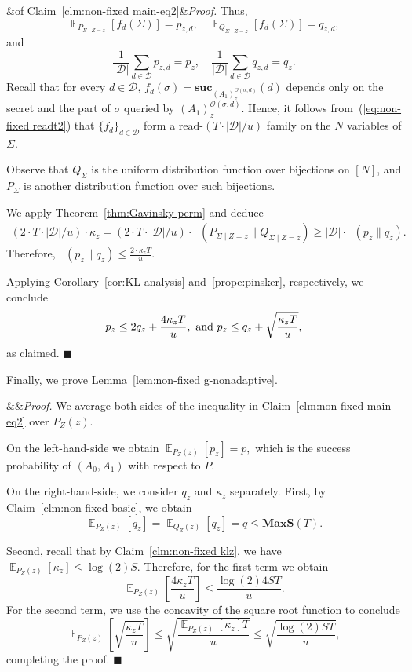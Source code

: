 \documentclass[11pt]{article}
\renewenvironment{proof}[1][]
    {\noindent
       \ifx&#1&{\it Proof.}
       \else{\it Proof ({#1}).}
       \fi}{\hfill $\blacksquare$}
\DeclareMathOperator*{\E}{\mathbb{E}}
\DeclareMathOperator{\KL}{D_{\text{KL}}}
\newcommand{\SECS}{{\mathcal{D}}}
\newcommand{\secv}{{d}}
\newcommand{\SUC}{\boldsymbol{suc}}
\newcommand{\MAXS}{\boldsymbol{MaxS}}
\begin{document}
\begin{proof}[of Claim~\ref{clm:non-fixed main-eq2}]
Thus,
$$ 
\E_{   P_{\Sigma \mid Z = z} } [f_\secv(\Sigma)] = p_{z,\secv},\quad \E_{   Q_{\Sigma \mid Z = z} } [f_\secv(\Sigma)] = q_{z,\secv},
$$
and
$$ 
\frac{1}{|\SECS|} \sum_{\secv \in \SECS} 
p_{z,\secv} = p_z,\quad \frac{1}{|\SECS|} \sum_{\secv \in \SECS} 
q_{z,\secv} = q_z.
$$
Recall that for every $\secv \in \SECS$, $f_\secv(\sigma) = \SUC_{(A_1)_{z}^{\mathcal{O}(\sigma,\secv)}}(\secv)$
depends only on the secret and the part of $\sigma$ queried by $(A_1)_{z}^{\mathcal{O}(\sigma,\secv)}$. Hence, it follows from~(\ref{eq:non-fixed readt2}) that
$\{ f_\secv \}_{\secv \in \SECS}$ form a read-$(T \cdot |\SECS|/u)$ family on the $N$ variables of $\Sigma$.


Observe that $Q_\Sigma$ is the uniform distribution function over bijections on $[N]$, and $P_\Sigma$ is another distribution function over such bijections.

We apply Theorem~\ref{thm:Gavinsky-perm} and deduce  
\begin{align*}
(2 \cdot T \cdot |\SECS|/u) \cdot  \kappa_z  
= 
(2 \cdot T \cdot |\SECS|/u) \cdot \KL( P_{\Sigma \mid Z = z} \| Q_{\Sigma \mid Z = z} ) 
\geq 
|\SECS| \cdot 
\KL( p_z \| 
     q_z ).
\end{align*}
Therefore,
$\KL( p_z \| q_z ) \leq \frac{2 \cdot \kappa_z T}{u}$.

\medskip \noindent Applying Corollary~\ref{cor:KL-analysis} and~\ref{prope:pinsker}, respectively, we conclude 
$$p_{z} \leq 2 q_{z} + \frac{4 \kappa_{z} T }{u},
\textup{ and }
p_{z} \leq q_{z} + \sqrt{\frac{\kappa_{z} T }{u}},$$
as claimed.
\end{proof}

\medskip 

Finally, we prove Lemma~\ref{lem:non-fixed g-nonadaptive}.

\medskip

\begin{proof} [of Lemma~\ref{lem:non-fixed g-nonadaptive}]
We average both sides of the inequality in Claim~\ref{clm:non-fixed main-eq2} 
over $P_{Z}(z)$.

On the left-hand-side we obtain $\E_{P_{Z}(z)}
[p_{z}]=p,$ which is the success probability of $(A_0,A_1)$ with respect to $P$.

On the right-hand-side,
we consider $q_z$ and $\kappa_z$ separately.
First, by Claim~\ref{clm:non-fixed basic}, we obtain
$$
\E_{P_{Z}(z)}[q_z] = \E_{Q_{Z}(z)}[q_z] = q \leq \MAXS(T).$$

Second, recall that by Claim~\ref{clm:non-fixed klz}, we have $\E_{P_{Z}(z)}[\kappa_{z}] \leq \log(2) S$. Therefore, for the first term we obtain
\[
    \E_{P_{Z}(z)}\left[\frac{4 \kappa_{z} T }{u}\right] \le \frac{\log(2) 4 S T }{u}.
\]
For the second term, we use the concavity of the square root function to conclude
\[
    \E_{P_{Z}(z)}\left[\sqrt{\frac{\kappa_{z} T }{u}}\right] \le 
    \sqrt{\frac{\E_{P_{Z}(z)}[\kappa_{z}] T }{u}} \le
    \sqrt{\frac{\log(2) S T }{u}},
\]
completing the proof.
\end{proof}
\end{document}
